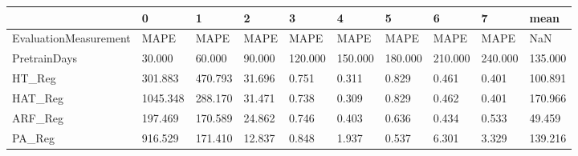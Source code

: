 \begin{tabular}{llllllllll}
\toprule
{} &        0 &       1 &      2 &       3 &       4 &       5 &       6 &       7 &    mean \\
\midrule
EvaluationMeasurement &     MAPE &    MAPE &   MAPE &    MAPE &    MAPE &    MAPE &    MAPE &    MAPE &     NaN \\
PretrainDays          &   30.000 &  60.000 & 90.000 & 120.000 & 150.000 & 180.000 & 210.000 & 240.000 & 135.000 \\
HT\_Reg                &  301.883 & 470.793 & 31.696 &   0.751 &   0.311 &   0.829 &   0.461 &   0.401 & 100.891 \\
HAT\_Reg               & 1045.348 & 288.170 & 31.471 &   0.738 &   0.309 &   0.829 &   0.462 &   0.401 & 170.966 \\
ARF\_Reg               &  197.469 & 170.589 & 24.862 &   0.746 &   0.403 &   0.636 &   0.434 &   0.533 &  49.459 \\
PA\_Reg                &  916.529 & 171.410 & 12.837 &   0.848 &   1.937 &   0.537 &   6.301 &   3.329 & 139.216 \\
\bottomrule
\end{tabular}
